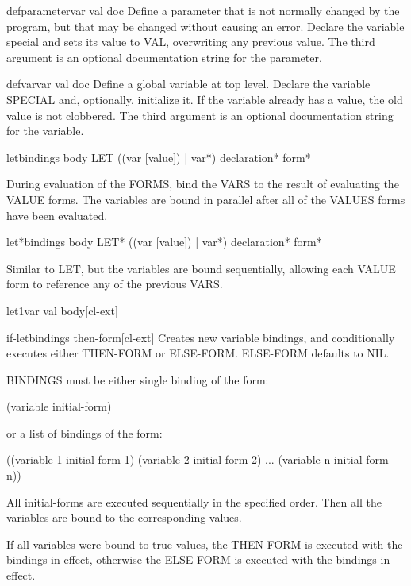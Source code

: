 \documentclass[10pt,english]{book}
\begin{document}
\begin{macro}{defparameter}{var val \op doc}
  Define a parameter that is not normally changed by the program,
  but that may be changed without causing an error. Declare the
  variable special and sets its value to VAL, overwriting any
  previous value. The third argument is an optional documentation
  string for the parameter.
\end{macro}

\begin{macro}{defvar}{var \op val doc}
  Define a global variable at top level. Declare the variable
  SPECIAL and, optionally, initialize it. If the variable already has a
  value, the old value is not clobbered. The third argument is an optional
  documentation string for the variable.
\end{macro}

\begin{specialop}{let}{bindings \body body}
  LET ({(var [value]) | var}*) declaration* form*

During evaluation of the FORMS, bind the VARS to the result of evaluating the
VALUE forms. The variables are bound in parallel after all of the VALUES forms
have been evaluated.
\end{specialop}

\begin{specialop}{let*}{bindings \body body}
  LET* ({(var [value]) | var}*) declaration* form*

Similar to LET, but the variables are bound sequentially, allowing each VALUE
form to reference any of the previous VARS.
\end{specialop}

\begin{macro}{let1}{var val \body body}[cl-ext]
  
\end{macro}

\begin{macro}{if-let}{bindings \body then-form}[cl-ext]
  Creates new variable bindings, and conditionally executes either
THEN-FORM or ELSE-FORM. ELSE-FORM defaults to NIL.

BINDINGS must be either single binding of the form:

 (variable initial-form)

or a list of bindings of the form:

 ((variable-1 initial-form-1)
  (variable-2 initial-form-2)
  ...
  (variable-n initial-form-n))

All initial-forms are executed sequentially in the specified order. Then all
the variables are bound to the corresponding values.

If all variables were bound to true values, the THEN-FORM is executed with the
bindings in effect, otherwise the ELSE-FORM is executed with the bindings in
effect.
\end{macro}
\end{document}
